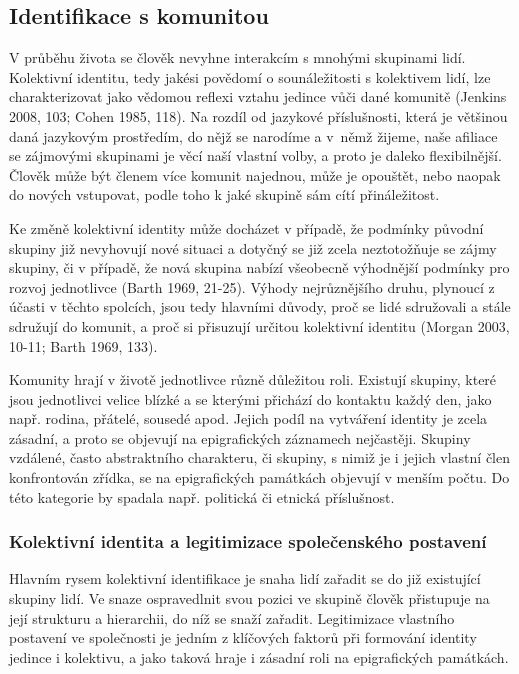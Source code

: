 \subsection[identifikace-s-komunitou]{Identifikace s komunitou}

V průběhu života se člověk nevyhne interakcím s mnohými skupinami lidí. Kolektivní identitu, tedy jakési povědomí o sounáležitosti s kolektivem lidí, lze charakterizovat jako vědomou reflexi vztahu jedince vůči dané komunitě (Jenkins 2008, 103; Cohen 1985, 118). Na rozdíl od jazykové příslušnosti, která je většinou daná jazykovým prostředím, do nějž se narodíme a v~němž žijeme, naše afiliace se zájmovými skupinami je věcí naší vlastní volby, a proto je daleko flexibilnější. Člověk může být členem více komunit najednou, může je opouštět, nebo naopak do nových vstupovat, podle toho k jaké skupině sám cítí přináležitost.

Ke změně kolektivní identity může docházet v případě, že podmínky původní skupiny již nevyhovují nové situaci a dotyčný se již zcela neztotožňuje se zájmy skupiny, či v případě, že nová skupina nabízí všeobecně výhodnější podmínky pro rozvoj jednotlivce (Barth 1969, 21-25). Výhody nejrůznějšího druhu, plynoucí z účasti v těchto spolcích, jsou tedy hlavními důvody, proč se lidé sdružovali a stále sdružují do komunit, a proč si přisuzují určitou kolektivní identitu (Morgan 2003, 10-11; Barth 1969, 133).

Komunity hrají v životě jednotlivce různě důležitou roli. Existují skupiny, které jsou jednotlivci velice blízké a se kterými přichází do kontaktu každý den, jako např. rodina, přátelé, sousedé apod. Jejich podíl na vytváření identity je zcela zásadní, a proto se objevují na epigrafických záznamech nejčastěji. Skupiny vzdálené, často abstraktního charakteru, či skupiny, s nimiž je i jejich vlastní člen konfrontován zřídka, se na epigrafických památkách objevují v menším počtu. Do této kategorie by spadala např. politická či etnická příslušnost.

\subsubsection[kolektivní-identita-a-legitimizace-společenského-postavení]{Kolektivní identita a legitimizace společenského postavení}

Hlavním rysem kolektivní identifikace je snaha lidí zařadit se do již existující skupiny lidí. Ve snaze ospravedlnit svou pozici ve skupině člověk přistupuje na její strukturu a hierarchii, do níž se snaží zařadit. Legitimizace vlastního postavení ve společnosti je jedním z klíčových faktorů při formování identity jedince i kolektivu, a jako taková hraje i zásadní roli na epigrafických památkách.

